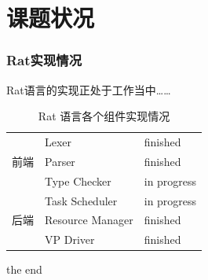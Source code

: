 \documentclass{beamer}
\begin{document}
\section{课题状况}
\frame{\tableofcontents[currentsection]}
\begin{frame}
  \frametitle{Rat实现情况}
  Rat语言的实现正处于工作当中……
  \begin{table}
    \caption{Rat 语言各个组件实现情况}
    \begin{tabular}{|l|l|l|}
      \hline
      \multirow{3}{*}{前端} & Lexer & finished\\
      \cline{2-3}
      & Parser & finished\\
      \cline{2-3}
      & Type Checker & in progress\\
      \hline
      \multirow{3}{*}{后端} & Task Scheduler & in progress\\
      \cline{2-3}
      & Resource Manager & finished\\
      \cline{2-3}
      & \alert{VP Driver} & finished\\
      \hline
    \end{tabular}
  \end{table}
\end{frame}

\begin{frame}
  \Huge{the end}
\end{frame}
\end{document}
